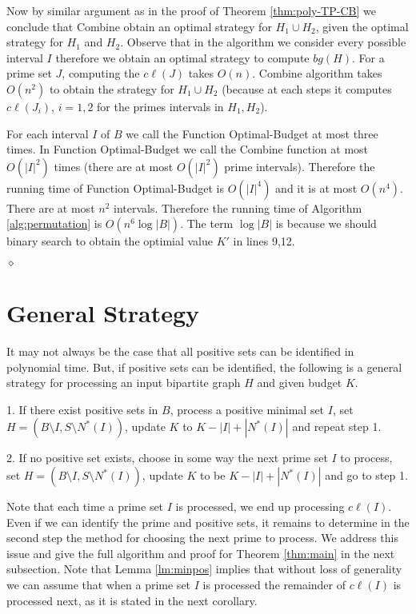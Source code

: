 \documentclass[letterpaper,11pt,abstracton]{scrartcl}
\newcommand{\qed}{\hfill$\diamond$}
\begin{document}
Now by similar argument as in the proof of Theorem \ref{thm:poly-TP-CB} we conclude that Combine
obtain an optimal strategy for $H_1 \cup H_2$, given the optimal strategy for $H_1$ and $H_2$.
Observe that in the algorithm we consider every possible interval $I$ therefore we obtain an optimal strategy to compute $bg(H)$.
For a prime set $J$, computing the $c\ell(J)$ takes $O(n)$. Combine algorithm takes $O(n^2)$ to obtain the strategy
for $H_1 \cup H_2$ (because at each steps it computes $c\ell(J_i)$, $i=1,2$ for the primes intervals in $H_1,H_2$).




For each interval $I$ of $B$ we call the Function Optimal-Budget at most three times. 
In Function Optimal-Budget we call the Combine function at most $O(|I|^2)$ times (there are at most $O(|I|^2)$ prime intervals). Therefore the running time of
Function Optimal-Budget is $O(|I|^4)$ and it is at most $O(n^4)$. There are at most $n^2$ intervals. 
Therefore the running time of Algorithm \ref{alg:permutation} is $O(n^6 \log|B|)$. The term $\log |B|$ is because we should binary search to obtain the optimial value $K'$ 
in lines 9,12. 



\qed



\section{General Strategy}\label{sec:general-strategy}
It may not always be the case that all positive sets can be identified
in polynomial time. But, if positive sets can be identified, the
following is a general strategy for processing an input bipartite graph $H$
and given budget $K$.

1. If there exist positive sets in $B$, process a positive minimal
set $I$, set $H = (B\setminus I, S\setminus N^*(I))$, update $K$ to  $K-|I|+|N^*(I)|$ and repeat step 1.

2. If no positive set exists, choose in some way the next prime
set $I$ to process, set $H = (B\setminus I, S\setminus N^*(I))$, update $K$ to be $K-|I|+|N^*(I)|$ and go to step 1.

Note that each time a prime set $I$ is processed, we end up processing
$c\ell(I)$.  Even if we can identify the prime and positive sets, it
remains to determine in the second step the method for choosing the next
prime to process.  We address this issue and give the full algorithm and
proof for Theorem \ref{thm:main} in the next subsection.  Note that Lemma
\ref{lm:minpos} implies that without loss of generality we can assume that
when a prime set $I$ is processed the remainder of $c\ell(I)$ is processed
next, as it is stated in the next corollary.
\end{document}
